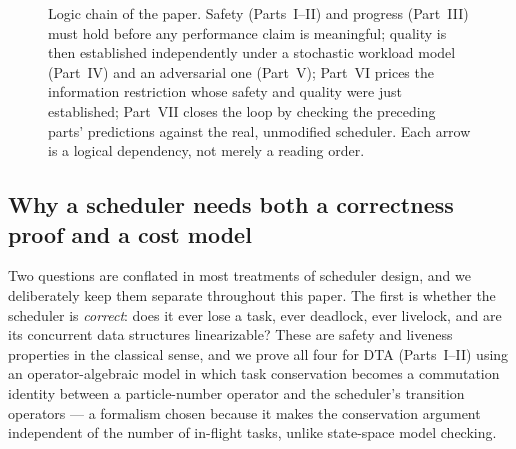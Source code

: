 \documentclass[11pt,a4paper]{report}
\begin{document}
\begin{figure}[htbp]
{%
}
\caption{Logic chain of the paper. Safety (Parts~I--II) and progress
(Part~III) must hold before any performance claim is meaningful; quality is
then established independently under a stochastic workload model
(Part~IV) and an adversarial one (Part~V); Part~VI prices the information
restriction whose safety and quality were just established; Part~VII
closes the loop by checking the preceding parts' predictions against the
real, unmodified scheduler. Each arrow is a logical dependency, not merely
a reading order.}
\label{fig:logic-chain}
\end{figure}

\subsection*{Why a scheduler needs both a correctness proof and a cost model}

Two questions are conflated in most treatments of scheduler design, and we
deliberately keep them separate throughout this paper. The first is
whether the scheduler is \emph{correct}: does it ever lose a task, ever
deadlock, ever livelock, and are its concurrent data structures
linearizable? These are safety and liveness properties in the classical
sense, and we prove all four for DTA (Parts~I--II) using an
operator-algebraic model in which task conservation becomes a commutation
identity between a particle-number operator and the scheduler's
transition operators --- a formalism chosen because it makes the
conservation argument independent of the number of in-flight tasks, unlike
state-space model checking.
\end{document}
